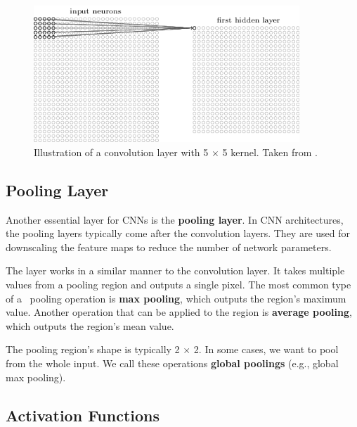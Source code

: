 \begin{figure}[h]
    \centering
    \includegraphics[width=10cm]{Sources/Figures/convolution.png}
    \caption{Illustration of a convolution layer with 5 $\times$ 5 kernel. Taken from \cite{nielsenneural}.}
    \label{fig:convolution}
\end{figure}

\subsection{Pooling Layer}
Another essential layer for CNNs is the \textbf{pooling layer}. In CNN architectures, the pooling layers typically come after the convolution layers. They are used for downscaling the feature maps to reduce the number of network parameters. 

The layer works in a similar manner to the convolution layer. It takes multiple values from a pooling region and outputs a single pixel. The most common type of a~ pooling operation is \textbf{max pooling}, which outputs the region's maximum value. Another operation that can be applied to the region is \textbf{average pooling}, which outputs the region's mean value.

The pooling region's shape is typically 2 $\times$ 2. In some cases, we want to pool from the whole input. We call these operations \textbf{global poolings} (e.g., global max pooling).

\subsection{Activation Functions}
\label{afunctions}

